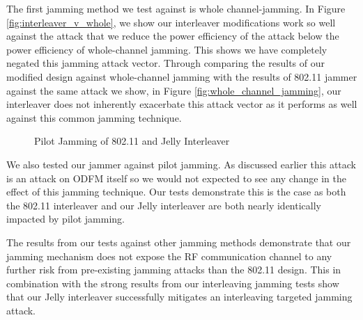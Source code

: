 \documentclass[sigconf]{acmart}
\begin{document}
The first jamming method we test against is whole channel-jamming. In Figure \ref{fig:interleaver_v_whole}, we show our interleaver modifications work so well against the attack that we reduce the power efficiency of the attack below the power efficiency of whole-channel jamming. This shows we have completely negated this jamming attack vector. Through comparing the results of our modified design against whole-channel jamming with the results of 802.11 jammer against the same attack we show, in Figure \ref{fig:whole_channel_jamming}, our interleaver does not inherently exacerbate this attack vector as it performs as well against this common jamming technique. 

\begin{figure}[ht]
    \centering
    
    
    \caption{Pilot Jamming of 802.11 and Jelly Interleaver}
    \label{fig:pilot_jamming}
\end{figure}

We also tested our jammer against pilot jamming. As discussed earlier this attack is an attack on ODFM itself so we would not expected to see any change in the effect of this jamming technique. Our tests demonstrate this is the case as both the 802.11 interleaver and our Jelly interleaver are both nearly identically impacted by pilot jamming. 

The results from our tests against other jamming methods demonstrate that our jamming mechanism does not expose the RF communication channel to any further risk from pre-existing jamming attacks than the 802.11 design. This in combination with the strong results from our interleaving jamming tests show that our Jelly interleaver successfully mitigates an interleaving targeted jamming attack.
\end{document}
